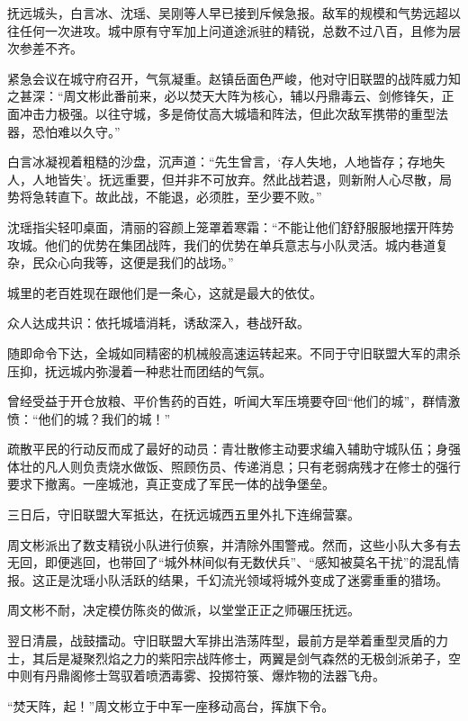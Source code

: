 \vspace{2em}

抚远城头，白言冰、沈瑶、吴刚等人早已接到斥候急报。敌军的规模和气势远超以往任何一次进攻。城中原有守军加上问道途派驻的精锐，总数不过八百，且修为层次参差不齐。

紧急会议在城守府召开，气氛凝重。赵镇岳面色严峻，他对守旧联盟的战阵威力知之甚深：“周文彬此番前来，必以焚天大阵为核心，辅以丹鼎毒云、剑修锋矢，正面冲击力极强。以往守城，多是倚仗高大城墙和阵法，但此次敌军携带的重型法器，恐怕难以久守。”

白言冰凝视着粗糙的沙盘，沉声道：“先生曾言，‘存人失地，人地皆存；存地失人，人地皆失’。抚远重要，但并非不可放弃。然此战若退，则新附人心尽散，局势将急转直下。故此战，不能退，必须胜，至少要不败。”

沈瑶指尖轻叩桌面，清丽的容颜上笼罩着寒霜：“不能让他们舒舒服服地摆开阵势攻城。他们的优势在集团战阵，我们的优势在单兵意志与小队灵活。城内巷道复杂，民众心向我等，这便是我们的战场。”

城里的老百姓现在跟他们是一条心，这就是最大的依仗。

众人达成共识：依托城墙消耗，诱敌深入，巷战歼敌。

随即命令下达，全城如同精密的机械般高速运转起来。不同于守旧联盟大军的肃杀压抑，抚远城内弥漫着一种悲壮而团结的气氛。

曾经受益于开仓放粮、平价售药的百姓，听闻大军压境要夺回“他们的城”，群情激愤：“他们的城？我们的城！”

疏散平民的行动反而成了最好的动员：青壮散修主动要求编入辅助守城队伍；身强体壮的凡人则负责烧水做饭、照顾伤员、传递消息；只有老弱病残才在修士的强行要求下撤离。一座城池，真正变成了军民一体的战争堡垒。

\vspace{2em}

三日后，守旧联盟大军抵达，在抚远城西五里外扎下连绵营寨。

周文彬派出了数支精锐小队进行侦察，并清除外围警戒。然而，这些小队大多有去无回，即便逃回，也带回了“城外林间似有无数伏兵”、“感知被莫名干扰”的混乱情报。这正是沈瑶小队活跃的结果，千幻流光领域将城外变成了迷雾重重的猎场。

周文彬不耐，决定模仿陈炎的做派，以堂堂正正之师碾压抚远。

翌日清晨，战鼓擂动。守旧联盟大军排出浩荡阵型，最前方是举着重型灵盾的力士，其后是凝聚烈焰之力的紫阳宗战阵修士，两翼是剑气森然的无极剑派弟子，空中则有丹鼎阁修士驾驭着喷洒毒雾、投掷符箓、爆炸物的法器飞舟。

“焚天阵，起！”周文彬立于中军一座移动高台，挥旗下令。

